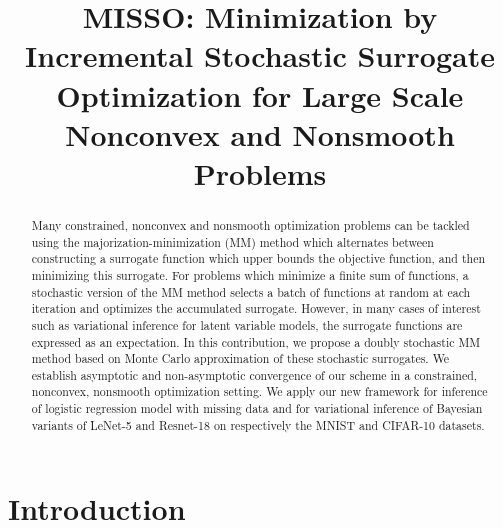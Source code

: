 \documentclass{article}
\title{MISSO: Minimization by Incremental Stochastic Surrogate Optimization for Large Scale Nonconvex and Nonsmooth Problems}
\begin{document}
\maketitle

\begin{abstract}
Many constrained, nonconvex and nonsmooth optimization problems can be tackled using the majorization-minimization (MM) method which alternates between constructing a surrogate function which upper bounds the objective function, and then minimizing this surrogate.
For problems which minimize a finite sum of functions, a stochastic version of the MM method selects a batch of functions at random at each iteration and optimizes the accumulated surrogate.
However, in many cases of interest such as  variational inference for latent variable models, the surrogate functions are expressed as an expectation. In this contribution, we propose a doubly stochastic MM method based on Monte Carlo approximation of these stochastic surrogates.
We establish asymptotic and non-asymptotic convergence of our scheme in a constrained, nonconvex, nonsmooth optimization setting.
We apply our new framework for inference of logistic regression model with missing data and for variational inference of Bayesian variants of LeNet-5 and Resnet-18 on respectively the MNIST and CIFAR-10 datasets.
\end{abstract}

\vspace{-0.1in}
\section{Introduction}
\vspace{-0.05in}
\end{document}
